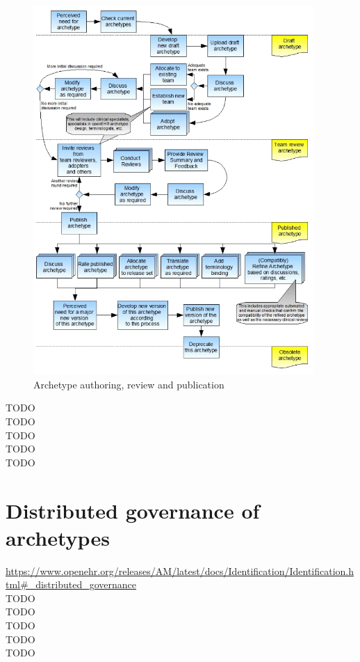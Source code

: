 \documentclass[mim_thesis.tex]{subfiles}
\begin{document}
\begin{figure}[H]
	\centering
    \includegraphics[width=0.95\textwidth]{img/arch_auth.PNG}
	\caption{Archetype authoring, review and publication \citep{Leslie2008}}
	\label{fig:arch_auth}
\end{figure}

TODO\\
TODO\\
TODO\\
TODO\\
TODO\\


\section{Distributed governance of archetypes}
\url{https://www.openehr.org/releases/AM/latest/docs/Identification/Identification.html#_distributed_governance} \\

TODO\\
TODO\\
TODO\\
TODO\\
TODO\\
\end{document}
